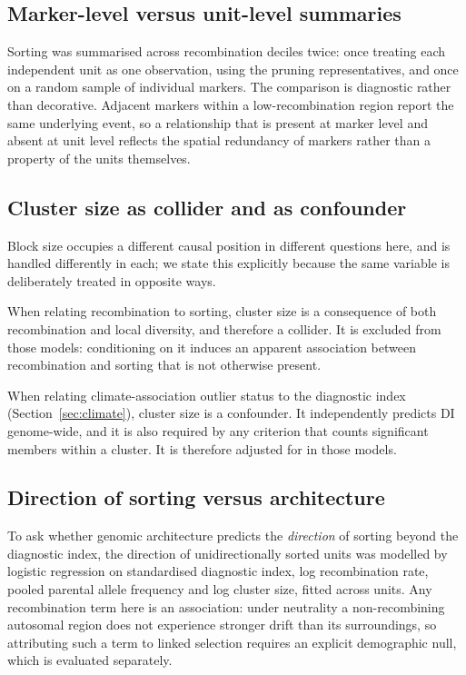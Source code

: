 \documentclass[11pt]{article}
\begin{document}
\subsection{Marker-level versus unit-level summaries}
Sorting was summarised across recombination deciles twice: once treating each
independent unit as one observation, using the pruning representatives, and once
on a random sample of individual markers. The comparison is diagnostic rather
than decorative. Adjacent markers within a low-recombination region report the
same underlying event, so a relationship that is present at marker level and
absent at unit level reflects the spatial redundancy of markers rather than a
property of the units themselves.

\subsection{Cluster size as collider and as confounder}
Block size occupies a different causal position in different questions here, and
is handled differently in each; we state this explicitly because the same
variable is deliberately treated in opposite ways.

When relating recombination to sorting, cluster size is a consequence of both
recombination and local diversity, and therefore a collider. It is excluded from
those models: conditioning on it induces an apparent association between
recombination and sorting that is not otherwise present.

When relating climate-association outlier status to the diagnostic index
(Section~\ref{sec:climate}), cluster size is a confounder. It independently
predicts DI genome-wide, and it is also required by any criterion that counts
significant members within a cluster. It is therefore adjusted for in those models.

\subsection{Direction of sorting versus architecture}
To ask whether genomic architecture predicts the \emph{direction} of sorting
beyond the diagnostic index, the direction of unidirectionally sorted units was
modelled by logistic regression on standardised diagnostic index, log
recombination rate, pooled parental allele frequency and log cluster size, fitted
across units. Any recombination term here is an association: under neutrality a
non-recombining autosomal region does not experience stronger drift than its
surroundings, so attributing such a term to linked selection requires an
explicit demographic null, which is evaluated separately.
\end{document}
